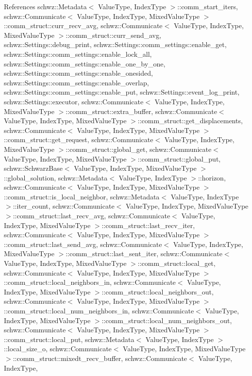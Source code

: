 References schwz\+::\+Metadata$<$ Value\+Type, Index\+Type $>$\+::comm\+\_\+start\+\_\+iters, schwz\+::\+Communicate$<$ Value\+Type, Index\+Type, Mixed\+Value\+Type $>$\+::comm\+\_\+struct\+::curr\+\_\+recv\+\_\+avg, schwz\+::\+Communicate$<$ Value\+Type, Index\+Type, Mixed\+Value\+Type $>$\+::comm\+\_\+struct\+::curr\+\_\+send\+\_\+avg, schwz\+::\+Settings\+::debug\+\_\+print, schwz\+::\+Settings\+::comm\+\_\+settings\+::enable\+\_\+get, schwz\+::\+Settings\+::comm\+\_\+settings\+::enable\+\_\+lock\+\_\+all, schwz\+::\+Settings\+::comm\+\_\+settings\+::enable\+\_\+one\+\_\+by\+\_\+one, schwz\+::\+Settings\+::comm\+\_\+settings\+::enable\+\_\+onesided, schwz\+::\+Settings\+::comm\+\_\+settings\+::enable\+\_\+overlap, schwz\+::\+Settings\+::comm\+\_\+settings\+::enable\+\_\+put, schwz\+::\+Settings\+::event\+\_\+log\+\_\+print, schwz\+::\+Settings\+::executor, schwz\+::\+Communicate$<$ Value\+Type, Index\+Type, Mixed\+Value\+Type $>$\+::comm\+\_\+struct\+::extra\+\_\+buffer, schwz\+::\+Communicate$<$ Value\+Type, Index\+Type, Mixed\+Value\+Type $>$\+::comm\+\_\+struct\+::get\+\_\+displacements, schwz\+::\+Communicate$<$ Value\+Type, Index\+Type, Mixed\+Value\+Type $>$\+::comm\+\_\+struct\+::get\+\_\+request, schwz\+::\+Communicate$<$ Value\+Type, Index\+Type, Mixed\+Value\+Type $>$\+::comm\+\_\+struct\+::global\+\_\+get, schwz\+::\+Communicate$<$ Value\+Type, Index\+Type, Mixed\+Value\+Type $>$\+::comm\+\_\+struct\+::global\+\_\+put, schwz\+::\+Schwarz\+Base$<$ Value\+Type, Index\+Type, Mixed\+Value\+Type $>$\+::global\+\_\+solution, schwz\+::\+Metadata$<$ Value\+Type, Index\+Type $>$\+::horizon, schwz\+::\+Communicate$<$ Value\+Type, Index\+Type, Mixed\+Value\+Type $>$\+::comm\+\_\+struct\+::is\+\_\+local\+\_\+neighbor, schwz\+::\+Metadata$<$ Value\+Type, Index\+Type $>$\+::iter\+\_\+count, schwz\+::\+Communicate$<$ Value\+Type, Index\+Type, Mixed\+Value\+Type $>$\+::comm\+\_\+struct\+::last\+\_\+recv\+\_\+avg, schwz\+::\+Communicate$<$ Value\+Type, Index\+Type, Mixed\+Value\+Type $>$\+::comm\+\_\+struct\+::last\+\_\+recv\+\_\+iter, schwz\+::\+Communicate$<$ Value\+Type, Index\+Type, Mixed\+Value\+Type $>$\+::comm\+\_\+struct\+::last\+\_\+send\+\_\+avg, schwz\+::\+Communicate$<$ Value\+Type, Index\+Type, Mixed\+Value\+Type $>$\+::comm\+\_\+struct\+::last\+\_\+sent\+\_\+iter, schwz\+::\+Communicate$<$ Value\+Type, Index\+Type, Mixed\+Value\+Type $>$\+::comm\+\_\+struct\+::local\+\_\+get, schwz\+::\+Communicate$<$ Value\+Type, Index\+Type, Mixed\+Value\+Type $>$\+::comm\+\_\+struct\+::local\+\_\+neighbors\+\_\+in, schwz\+::\+Communicate$<$ Value\+Type, Index\+Type, Mixed\+Value\+Type $>$\+::comm\+\_\+struct\+::local\+\_\+neighbors\+\_\+out, schwz\+::\+Communicate$<$ Value\+Type, Index\+Type, Mixed\+Value\+Type $>$\+::comm\+\_\+struct\+::local\+\_\+num\+\_\+neighbors\+\_\+in, schwz\+::\+Communicate$<$ Value\+Type, Index\+Type, Mixed\+Value\+Type $>$\+::comm\+\_\+struct\+::local\+\_\+num\+\_\+neighbors\+\_\+out, schwz\+::\+Communicate$<$ Value\+Type, Index\+Type, Mixed\+Value\+Type $>$\+::comm\+\_\+struct\+::local\+\_\+put, schwz\+::\+Metadata$<$ Value\+Type, Index\+Type $>$\+::local\+\_\+size\+\_\+o, schwz\+::\+Communicate$<$ Value\+Type, Index\+Type, Mixed\+Value\+Type $>$\+::comm\+\_\+struct\+::mixedt\+\_\+recv\+\_\+buffer, schwz\+::\+Communicate$<$ Value\+Type, Index\+Type, 